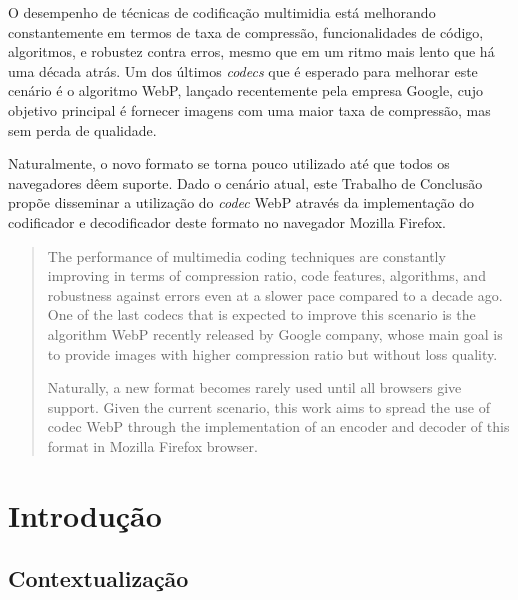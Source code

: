 \documentclass[espaco=simples,appendix=Name]{abnt}
\begin{document}
\capa
\folhaderosto
\listoffigures
\listoftables

\sumario

\newcommand{\ingles}[1]{\textsl{#1}}
\newcommand{\bibTeX}{bib\kern-.13ex\TeX}

\begin{resumo}
O desempenho de técnicas de codificação multimidia está melhorando constantemente em termos de taxa de compressão, funcionalidades de código, algoritmos, e robustez contra erros, mesmo que em um ritmo mais lento que há uma década atrás. Um dos últimos \ingles{codecs} que é esperado para melhorar este cenário é o algoritmo WebP, lançado recentemente pela empresa Google, cujo objetivo principal é fornecer imagens com uma maior taxa de compressão, mas sem perda de qualidade. 

Naturalmente, o novo formato se torna pouco utilizado até que todos os navegadores dêem suporte. Dado o cenário atual, este Trabalho de Conclusão propõe disseminar a utilização do \ingles{codec} WebP através da implementação do codificador e decodificador deste formato no navegador Mozilla Firefox.
\end{resumo}

\begin{abstract}
The performance of multimedia coding techniques are constantly improving in terms of compression ratio, code features, algorithms, and robustness against errors even at a slower pace compared to a decade ago. One of the last codecs that is expected to improve this scenario is the algorithm WebP recently released by Google company, whose main goal is to provide images with higher compression ratio but without loss quality. 

Naturally, a new format becomes rarely used until all browsers give support. Given the current scenario, this work aims to spread the use of codec WebP through the implementation of an encoder and decoder of this format in Mozilla Firefox browser.
\end{abstract}

\onehalfspacing

\chapter{Introdução}

\section{Contextualização}
\end{document}
